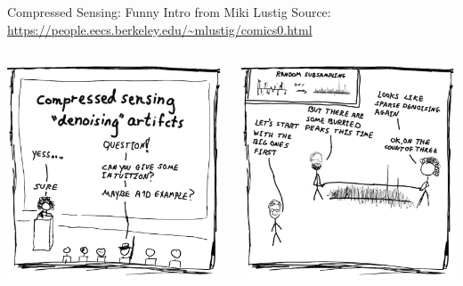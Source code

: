 \documentclass[aspectratio=169]{beamer}
\begin{document}
	\begin{frame}{Compressed Sensing: Funny Intro from Miki Lustig}
		Source: \url{https://people.eecs.berkeley.edu/~mlustig/comics0.html}
		\vspace{1em}
		\begin{columns}
			\centering
			\includegraphics[width=\columnwidth]{figures/cs-lustig-comics-19.png}
			
			\centering
			\includegraphics[width=\columnwidth]{figures/cs-lustig-comics-20.png}
		\end{columns}
	\end{frame}
	
\end{document}
